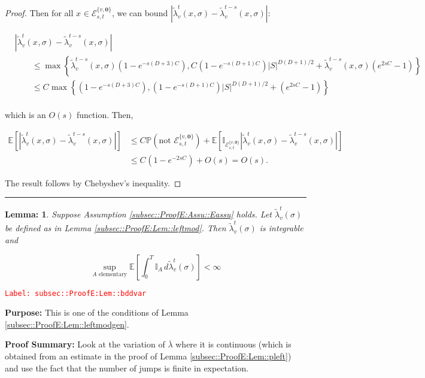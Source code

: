 \documentclass[12pt]{article}
\newcommand{\mb}{\mathbb}
\newcommand{\mc}{\mathcal}
\newcommand{\ov}{\overline}
\newcommand{\te}{\text}
\newcommand{\tr}{\textcolor{red}}
\newcommand{\labe}[1]{\tr{\texttt{Label: #1}}}
\newcommand{\purpose}{\textbf{Purpose: }}
\newcommand{\pfsum}{\textbf{Proof Summary: }}
\newcommand{\lin}{\rule{\linewidth}{0.4 pt}}
\newcommand{\pr}{\mb{P}}							%
\newcommand{\ex}[1]{\mb{E}\left[#1\right]}			%
\renewcommand{\root}{\mathbf{0}}				%
\renewcommand{\v}{v}							%
\renewcommand{\S}{S}							%
\newcommand{\s}{\sigma}							%
\newcommand{\T}{T}								%
\renewcommand{\t}{t}							%
\newcommand{\degr}{D}								%
\renewcommand{\tt}{s}								%
\newcommand{\xvts}[2]{x_{#1}{#2}}					%
\newcommand{\crate}[2]{\alt{\lambda}_{#1}^{#2}}		%
\newcommand{\const}[1]{C_{#1}}						%
\newcommand{\alt}{\widetilde}						%
\newcommand{\evnt}{\mc{E}}						%
\newcommand{\typset}{A}							%
\newtheorem{lem}[thms]{Lemma: }
\begin{document}
\begin{proof}
Then for all \(\xvts{}{} \in \evnt^{\{\v,\root\}}_{\tt,\t}\), we can bound \(|\crate{\v}{\t}(\xvts{}{},\s) - \crate{\v}{\t-\tt}(\xvts{}{},\s)|\):

\begin{align*}
&|\crate{\v}{\t}(\xvts{}{},\s) - \crate{\v}{\t-\tt}(\xvts{}{},\s)| \\
&\hspace{24pt}\leq \max\left\{\crate{\v}{\t-\tt}(\xvts{}{},\s)\left(1 - e^{-\tt(\degr+3)\const{}}\right),\const{}(1-e^{-\tt(\degr+1)\const{}})|\S|^{\degr(\degr+1)/2} + \crate{\v}{\t-\tt}(\xvts{}{},\s)\left(e^{2\tt\const{}} - 1\right)\right\}\\
&\hspace{24pt}\leq \const{}\max\left\{\left(1 - e^{-\tt(\degr+3)\const{}}\right),(1-e^{-\tt(\degr+1)\const{}})|\S|^{\degr(\degr+1)/2} + \left(e^{2\tt\const{}} - 1\right)\right\}\\
\end{align*}

which is an \(O(s)\) function. Then,

\begin{align*}
\ex{|\crate{\v}{\t}(\xvts{}{},\s) - \crate{\v}{\t-\tt}(\xvts{}{},\s)|} &\leq \const{}\pr\left(\te{not }\evnt^{\{\v,\root\}}_{\tt,\t}\right) + \ex{\mb{I}_{\evnt^{\{\v,\root\}}_{\tt,\t}}|\crate{\v}{\t}(\xvts{}{},\s) - \crate{\v}{\t-\tt}(\xvts{}{},\s)|}\\
&\leq \const{}(1 - e^{-2\tt\const{}}) + O(s) = O(s).
\end{align*}

The result follows by Chebyshev's inequality.
\end{proof}

\lin

\begin{lem}
Suppose Assumption \ref{subsec::ProofE:Assu::Eassu} holds. Let \(\crate{\v}{\t}(\s)\) be defined as in Lemma \ref{subsec::ProofE:Lem::leftmod}. Then \(\crate{\v}{\t}(\s)\) is integrable and 

\[\sup_{\typset\te{ elementary}} \ex{\int_0^\T \mb{I}_\typset\,d\crate{\v}{\t}(\s)} < \infty\]
\label{subsec::ProofE:Lem::bddvar}
\end{lem}
\labe{subsec::ProofE:Lem::bddvar}

\purpose This is one of the conditions of Lemma \ref{subsec::ProofE:Lem::leftmodgen}.

\pfsum Look at the variation of \(\ov{\lambda}\) where it is continuous (which is obtained from an estimate in the proof of Lemma \ref{subsec::ProofE:Lem::pleft}) and use the fact that the number of jumps is finite in expectation.
\end{document}
